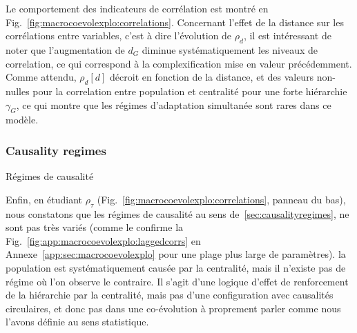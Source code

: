 Le comportement des indicateurs de corrélation est montré en Fig.~\ref{fig:macrocoevolexplo:correlations}. Concernant l'effet de la distance sur les corrélations entre variables, c'est à dire l'évolution de $\rho_d$, il est intéressant de noter que l'augmentation de $d_G$ diminue systématiquement les niveaux de correlation, ce qui correspond à la complexification mise en valeur précédemment. Comme attendu, $\rho_d\left[d\right]$ décroit en fonction de la distance, et des valeurs non-nulles pour la correlation entre population et centralité pour une forte hiérarchie $\gamma_G$, ce qui montre que les régimes d'adaptation simultanée sont rares dans ce modèle.

\subsubsection{Causality regimes}{Régimes de causalité}

Enfin, en étudiant $\rho_{\tau}$ (Fig.~\ref{fig:macrocoevolexplo:correlations}, panneau du bas), nous constatons que les régimes de causalité au sens de~\ref{sec:causalityregimes}, ne sont pas très variés (comme le confirme la Fig.~\ref{fig:app:macrocoevolexplo:laggedcorrs} en Annexe~\ref{app:sec:macrocoevolexplo} pour une plage plus large de paramètres). la population est systématiquement causée par la centralité, mais il n'existe pas de régime où l'on observe le contraire. Il s'agit d'une logique d'effet de renforcement de la hiérarchie par la centralité, mais pas d'une configuration avec causalités circulaires, et donc pas dans une co-évolution à proprement parler comme nous l'avons définie au sens statistique.










